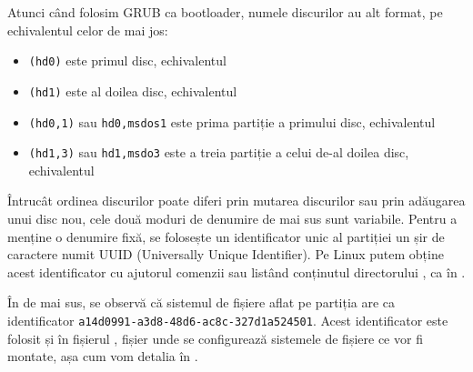 Atunci când folosim GRUB ca bootloader, numele discurilor au alt format,
pe echivalentul celor de mai jos:

\begin{itemize}
  \item \texttt{(hd0)} este primul disc, echivalentul 
  \item \texttt{(hd1)} este al doilea disc, echivalentul 
  \item \texttt{(hd0,1)} sau \texttt{hd0,msdos1} este prima partiție a primului disc,
    echivalentul 
  \item \texttt{(hd1,3)} sau \texttt{hd1,msdo3} este a treia partiție a celui de-al doilea
    disc, echivalentul 
\end{itemize}

Întrucât ordinea discurilor poate diferi prin mutarea discurilor sau prin
adăugarea unui disc nou, cele două moduri de denumire de mai sus sunt variabile.
Pentru a menține o denumire fixă, se folosește un identificator unic al
partiției un șir de caractere numit UUID 
(Universally Unique Identifier). Pe Linux putem obține acest identificator cu
ajutorul comenzii  sau listând conținutul directorului ,
ca în .


În  de mai sus, se observă că sistemul de fișiere aflat pe partiția  are ca
identificator \texttt{a14d0991-a3d8-48d6-ac8c-327d1a524501}. Acest identificator
este folosit și în fișierul , fișier unde se configurează
sistemele de fișiere ce vor fi montate, așa cum vom detalia în
.

